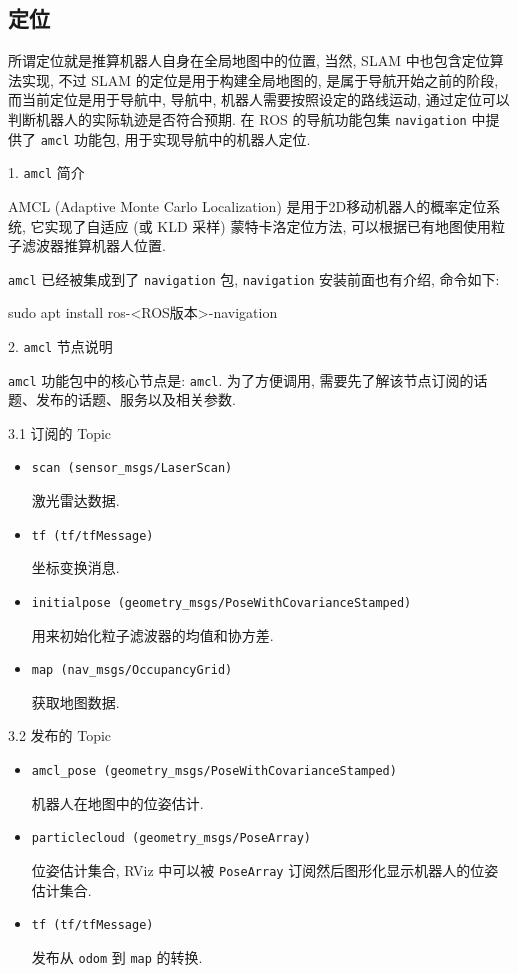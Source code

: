 \documentclass[openany, fontset=windowsold]{ctexbook}
\theoremstyle{kaiti}
\theoremstyle{normal}
\begin{document}
\subsection{定位}

所谓定位就是推算机器人自身在全局地图中的位置, 当然, SLAM 中也包含定位算法实现, 不过 SLAM 的定位是用于构建全局地图的, 是属于导航开始之前的阶段, 而当前定位是用于导航中, 导航中, 机器人需要按照设定的路线运动, 通过定位可以判断机器人的实际轨迹是否符合预期. 在 ROS 的导航功能包集 \verb|navigation| 中提供了 \verb|amcl| 功能包, 用于实现导航中的机器人定位.

1. \verb|amcl| 简介

AMCL (Adaptive Monte Carlo Localization) 是用于2D移动机器人的概率定位系统, 它实现了自适应 (或 KLD 采样) 蒙特卡洛定位方法, 可以根据已有地图使用粒子滤波器推算机器人位置.

\verb|amcl| 已经被集成到了 \verb|navigation| 包, \verb|navigation| 安装前面也有介绍, 命令如下:

\begin{bash}
  sudo apt install ros-<ROS版本>-navigation
\end{bash}

2. \verb|amcl| 节点说明

\verb|amcl| 功能包中的核心节点是: \verb|amcl|. 为了方便调用, 需要先了解该节点订阅的话题、发布的话题、服务以及相关参数.

3.1 订阅的 Topic

\begin{itemize}
  \item \verb|scan (sensor_msgs/LaserScan)|

  激光雷达数据.

  \item \verb|tf (tf/tfMessage)|

  坐标变换消息.

  \item \verb|initialpose (geometry_msgs/PoseWithCovarianceStamped)|

  用来初始化粒子滤波器的均值和协方差.

  \item \verb|map (nav_msgs/OccupancyGrid)|

  获取地图数据.
\end{itemize}

3.2 发布的 Topic

\begin{itemize}
  \item \verb|amcl_pose (geometry_msgs/PoseWithCovarianceStamped)|

  机器人在地图中的位姿估计.

  \item \verb|particlecloud (geometry_msgs/PoseArray)|

  位姿估计集合, RViz 中可以被 \verb|PoseArray| 订阅然后图形化显示机器人的位姿估计集合.

  \item \verb|tf (tf/tfMessage)|

  发布从 \verb|odom| 到 \verb|map| 的转换.
\end{itemize}
\end{document}
